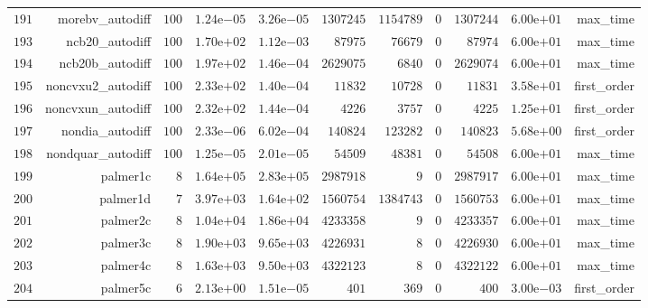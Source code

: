 \documentclass[varwidth=20cm,crop=true]{standalone}
\begin{document}
\begin{longtable}{rrrrrrrrrrr}
  \(   191\) & morebv\_autodiff & \(   100\) & \( 1.24\)e\(-05\) & \( 3.26\)e\(-05\) & \(1307245\) & \(1154789\) & \(     0\) & \(1307244\) & \( 6.00\)e\(+01\) & max\_time \\
  \(   193\) & ncb20\_autodiff & \(   100\) & \( 1.70\)e\(+02\) & \( 1.12\)e\(-03\) & \( 87975\) & \( 76679\) & \(     0\) & \( 87974\) & \( 6.00\)e\(+01\) & max\_time \\
  \(   194\) & ncb20b\_autodiff & \(   100\) & \( 1.97\)e\(+02\) & \( 1.46\)e\(-04\) & \(2629075\) & \(  6840\) & \(     0\) & \(2629074\) & \( 6.00\)e\(+01\) & max\_time \\
  \(   195\) & noncvxu2\_autodiff & \(   100\) & \( 2.33\)e\(+02\) & \( 1.40\)e\(-04\) & \( 11832\) & \( 10728\) & \(     0\) & \( 11831\) & \( 3.58\)e\(+01\) & first\_order \\
  \(   196\) & noncvxun\_autodiff & \(   100\) & \( 2.32\)e\(+02\) & \( 1.44\)e\(-04\) & \(  4226\) & \(  3757\) & \(     0\) & \(  4225\) & \( 1.25\)e\(+01\) & first\_order \\
  \(   197\) & nondia\_autodiff & \(   100\) & \( 2.33\)e\(-06\) & \( 6.02\)e\(-04\) & \(140824\) & \(123282\) & \(     0\) & \(140823\) & \( 5.68\)e\(+00\) & first\_order \\
  \(   198\) & nondquar\_autodiff & \(   100\) & \( 1.25\)e\(-05\) & \( 2.01\)e\(-05\) & \( 54509\) & \( 48381\) & \(     0\) & \( 54508\) & \( 6.00\)e\(+01\) & max\_time \\
  \(   199\) & palmer1c & \(     8\) & \( 1.64\)e\(+05\) & \( 2.83\)e\(+05\) & \(2987918\) & \(     9\) & \(     0\) & \(2987917\) & \( 6.00\)e\(+01\) & max\_time \\
  \(   200\) & palmer1d & \(     7\) & \( 3.97\)e\(+03\) & \( 1.64\)e\(+02\) & \(1560754\) & \(1384743\) & \(     0\) & \(1560753\) & \( 6.00\)e\(+01\) & max\_time \\
  \(   201\) & palmer2c & \(     8\) & \( 1.04\)e\(+04\) & \( 1.86\)e\(+04\) & \(4233358\) & \(     9\) & \(     0\) & \(4233357\) & \( 6.00\)e\(+01\) & max\_time \\
  \(   202\) & palmer3c & \(     8\) & \( 1.90\)e\(+03\) & \( 9.65\)e\(+03\) & \(4226931\) & \(     8\) & \(     0\) & \(4226930\) & \( 6.00\)e\(+01\) & max\_time \\
  \(   203\) & palmer4c & \(     8\) & \( 1.63\)e\(+03\) & \( 9.50\)e\(+03\) & \(4322123\) & \(     8\) & \(     0\) & \(4322122\) & \( 6.00\)e\(+01\) & max\_time \\
  \(   204\) & palmer5c & \(     6\) & \( 2.13\)e\(+00\) & \( 1.51\)e\(-05\) & \(   401\) & \(   369\) & \(     0\) & \(   400\) & \( 3.00\)e\(-03\) & first\_order \\

\end{longtable}
\end{document}
